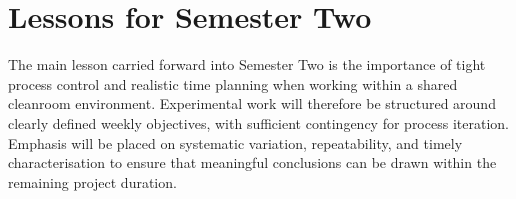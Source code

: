 \section{Lessons for Semester Two}

The main lesson carried forward into Semester Two is the importance of
tight process control and realistic time planning when working within a
shared cleanroom environment. Experimental work will therefore be
structured around clearly defined weekly objectives, with sufficient
contingency for process iteration. Emphasis will be placed on systematic
variation, repeatability, and timely characterisation to ensure that
meaningful conclusions can be drawn within the remaining project
duration.
